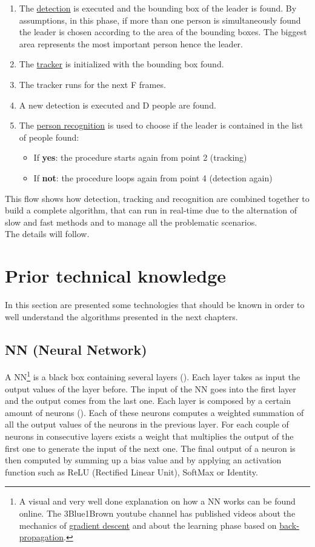 \begin{enumerate}
	\item The \underline{detection} is executed and the bounding box of the leader is found. By assumptions, in this phase, if more than one person is simultaneously found the leader is chosen according to the area of the bounding boxes. The biggest area represents the most important person hence the leader.
	\item The \underline{tracker} is initialized with the bounding box found.
	\item The tracker runs for the next F frames.
	\item A new detection is executed and D people are found.
	\item The \underline{person recognition} is used to choose if the leader is contained in the list of people found:
	\begin{itemize}
		\item If \textbf{yes}: the procedure starts again from point 2 (tracking)
		\item If \textbf{not}: the procedure loops again from point 4 (detection again)
	\end{itemize}
\end{enumerate}

This flow shows how detection, tracking and recognition are combined together to build a complete algorithm, that can run in real-time due to the alternation of slow and fast methods and to manage all the problematic scenarios.\\
The details will follow.


\section{Prior technical knowledge}
In this section are presented some technologies that should be known in order to well understand the algorithms presented in the next chapters.

\subsection{NN (Neural Network)} \label{sec:nn}
A NN\footnote{A visual and very well done explanation on how a NN works can be found online. The 3Blue1Brown youtube channel has published videos about the mechanics of \href{https://www.youtube.com/watch?v=IHZwWFHWa-w}{gradient descent} and about the learning phase based on \href{https://www.youtube.com/watch?v=Ilg3gGewQ5U}{back-propagation}.} is a black box containing several layers (). Each layer takes as input the output values of the layer before. The input of the NN goes into the first layer and the output comes from the last one. Each layer is composed by a certain amount of neurons (). Each of these neurons computes a weighted summation of all the output values of the neurons in the previous layer. For each couple of neurons in consecutive layers exists a weight that multiplies the output of the first one to generate the input of the next one. The final output of a neuron is then computed by summing up a bias value and by applying an activation function such as ReLU (Rectified Linear Unit), SoftMax or Identity.

